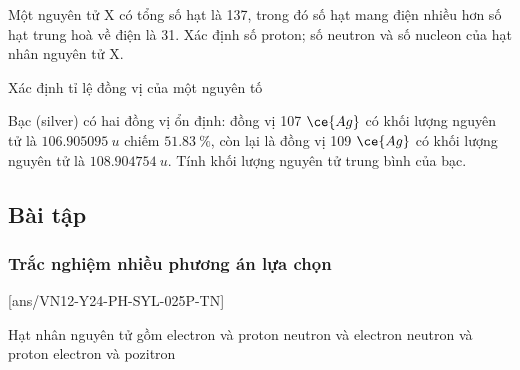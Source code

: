\begin{vd}
	Một nguyên tử X có tổng số hạt là 137, trong đó số hạt mang điện nhiều hơn số hạt trung hoà về điện là 31. Xác định số proton; số neutron và số nucleon của hạt nhân nguyên tử X.
\end{vd}
\begin{dang}{Xác định tỉ lệ đồng vị của một nguyên tố}
	\end{dang}
\begin{vd}
Bạc (silver) có hai đồng vị ổn định: đồng vị 107 $\ce{Ag}$ có khối lượng nguyên tử là $\SI{106.905095}{u}$ chiếm $\SI{51.83}{\percent}$, còn lại là đồng vị 109 $\ce{Ag}$ có khối lượng nguyên tử là $\SI{108.904754}{u}$. Tính khối lượng nguyên tử trung bình của bạc.
\end{vd}
\subsection{Bài tập}
\subsubsection{Trắc nghiệm nhiều phương án lựa chọn}
\setcounter{ex}{0}
[ans/VN12-Y24-PH-SYL-025P-TN]
\begin{ex}
	Hạt nhân nguyên tử gồm
	\choice
	{electron và proton}
	{neutron và electron}
	{\True neutron và proton}
	{electron và pozitron}
	\loigiai{}
\end{ex}


